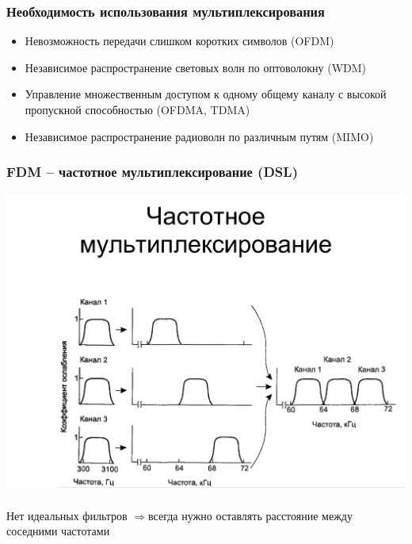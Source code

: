 \documentclass[utf8]{beamer}
\begin{document}
\begin{frame}
\frametitle{Необходимость использования мультиплексирования}
\begin{itemize}
	\item Невозможность передачи слишком коротких символов (OFDM)
	\item Независимое распространение световых волн по оптоволокну (WDM)
	\item Управление множественным доступом к одному общему каналу с высокой пропускной способностью (OFDMA, TDMA)
	\item Независимое распространение радиоволн по различным путям (MIMO)
\end{itemize}
\end{frame}
\begin{frame}
\frametitle{FDM -- частотное мультиплексирование (DSL)}
\begin{center}
\includegraphics[width=\textwidth]{pic/fdm.pdf}
\end{center}
Нет идеальных фильтров $\Rightarrow$всегда нужно оставлять расстояние между соседними частотами
\end{frame}
\end{document}
